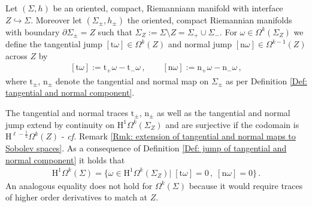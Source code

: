 \begin{Definition}\label{Def: jump of tangential and normal component}
	Let $(\Sigma,h)$ be an oriented, compact, Riemanniann manifold with interface $Z\hookrightarrow\Sigma$.
	Moreover let $(\Sigma_\pm,h_\pm)$ the oriented, compact Riemannian manifolds with boundary $\partial\Sigma_\pm=Z$ such that $\Sigma_Z:=
	\Sigma\setminus Z=\Sigma_+\cup\Sigma_-$.
	For $\omega\in \Omega^k(\Sigma_Z)$ we define the tangential jump $[\mathrm{t}\omega]\in \Omega^k(Z)$ and normal jump $[\mathrm{n}\omega]\in \Omega^{k-1}(Z)$ across $Z$ by
	\begin{align}\label{Eqn: tangential and normal jump}
		[\mathrm{t}\omega]:=\mathrm{t}_+\omega-\mathrm{t}_-\omega\,,\qquad
		[\mathrm{n}\omega]:=\mathrm{n}_+\omega-\mathrm{n}_-\omega\,,
	\end{align}
	where $\mathrm{t}_\pm$, $\mathrm{n}_\pm$ denote the tangential and normal map on $\Sigma_\pm$ as per Definition \ref{Def: tangential and normal component}.
\end{Definition}
\begin{remark}\label{Rmk: spaces with no jumps}
	 The tangential and normal traces $\mathrm{t}_\pm$, $\mathrm{n}_\pm$ as well as the tangential and normal jump extend by continuity on $\mathrm{H}^1\Omega^k(\Sigma_Z)$ and are surjective if the codomain is $\mathrm{H}^{\ell-\frac{1}{2}}\Omega^k(Z)$ - \emph{cf.} Remark \ref{Rmk: extension of tangential and normal maps to Sobolev spaces}. As a consequence of Definition \ref{Def: jump of tangential and normal component} it holds that
	\begin{align}
		\mathrm{H}^1\Omega^k(\Sigma)=
		\lbrace\omega\in\mathrm{H}^1\Omega^k(\Sigma_Z)|\;[\mathrm{t}\omega]=0\,,\;[\mathrm{n}\omega]=0
		\rbrace\,.
	\end{align}
	An analogous equality does not hold for $\Omega^k(\Sigma)$ because it would require traces of higher order derivatives to match at $Z$.
\end{remark}
